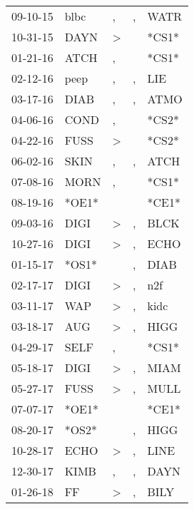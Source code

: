 \begin{supertabular}{lllll}
 09-10-15 &   blbc &                , &                , &   WATR \\
 10-31-15 &   DAYN &     \textgreater &                  &  *CS1* \\
 01-21-16 &   ATCH &                , &                  &  *CS1* \\
 02-12-16 &   peep &                , &                , &    LIE \\
 03-17-16 &   DIAB &                , &                , &   ATMO \\
 04-06-16 &   COND &                , &                  &  *CS2* \\
 04-22-16 &   FUSS &     \textgreater &                  &  *CS2* \\
 06-02-16 &   SKIN &                , &                , &   ATCH \\
 07-08-16 &   MORN &                , &                  &  *CS1* \\
 08-19-16 &  *OE1* &                  &                  &  *CE1* \\
 09-03-16 &   DIGI &     \textgreater &                , &   BLCK \\
 10-27-16 &   DIGI &     \textgreater &                , &   ECHO \\
 01-15-17 &  *OS1* &                  &                , &   DIAB \\
 02-17-17 &   DIGI &     \textgreater &                , &    n2f \\
 03-11-17 &    WAP &     \textgreater &                , &   kidc \\
 03-18-17 &    AUG &     \textgreater &                , &   HIGG \\
 04-29-17 &   SELF &                , &                  &  *CS1* \\
 05-18-17 &   DIGI &     \textgreater &                , &   MIAM \\
 05-27-17 &   FUSS &     \textgreater &                , &   MULL \\
 07-07-17 &  *OE1* &                  &                  &  *CE1* \\
 08-20-17 &  *OS2* &                  &                , &   HIGG \\
 10-28-17 &   ECHO &     \textgreater &                , &   LINE \\
 12-30-17 &   KIMB &                , &                , &   DAYN \\
 01-26-18 &     FF &     \textgreater &                , &   BILY \\

\end{supertabular}
